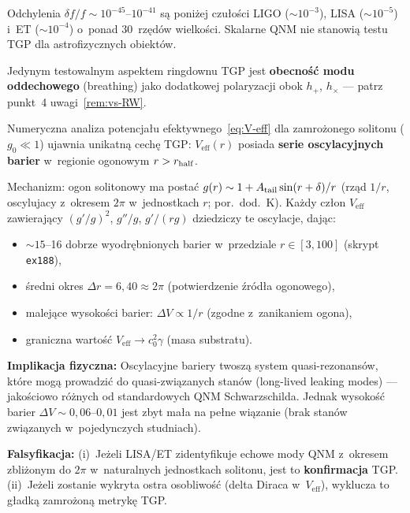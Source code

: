 \begin{remark}[Detektowalno\'s\'c]
Odchylenia $\delta f/f \sim 10^{-45}$--$10^{-41}$ s\k{a}
poni\.zej czu\l{}o\'sci LIGO ($\sim10^{-3}$),
LISA ($\sim10^{-5}$) i~ET ($\sim10^{-4}$) o~ponad
$30$~rz\k{e}d\'ow wielko\'sci. Ska\-lar\-ne QNM nie stanowi\k{a}
testu TGP dla astrofizycznych obiekt\'ow.

Jedynym testowalnym aspektem ringdownu TGP jest
\textbf{obecno\'s\'c modu oddechowego} (breathing)
jako dodatkowej polaryzacji obok $h_+$, $h_\times$ ---
patrz punkt~4 uwagi~\ref{rem:vs-RW}.
\end{remark}

\begin{remark}\label{rem:oscillatory-Veff}
Numeryczna analiza potencja\l{}u efektywnego~\eqref{eq:V-eff}
dla zamro\.zonego solitonu ($g_0 \ll 1$)
ujawnia unikatn\k{a} cech\k{e} TGP:
$V_{\mathrm{eff}}(r)$ posiada \textbf{serie oscylacyjnych barier}
w~regionie ogonowym $r > r_{\rm half}$.

Mechanizm: ogon solitonowy ma posta\'c
$g(r) \sim 1 + A_{\rm tail}\sin(r + \delta)/r$
(rz\k{a}d $1/r$, oscylujacy z~okresem $2\pi$ w~jednostkach
$r$; por.~dod.~K).
Ka\.zdy cz\l{}on $V_{\mathrm{eff}}$ zawieraj\k{a}cy
$(g'/g)^2$, $g''/g$, $g'/(rg)$ dziedziczy te oscylacje,
daj\k{a}c:
\begin{itemize}[nosep]
  \item $\sim 15$--16 dobrze wyodr\k{e}bnionych barier
    w~przedziale $r \in [3, 100]$ (skrypt \texttt{ex188}),
  \item \'sredni okres $\Delta r = 6{,}40 \approx 2\pi$
    (potwierdzenie \'zr\'od\l{}a ogonowego),
  \item malej\k{a}ce wysoko\'sci barier: $\Delta V \propto 1/r$
    (zgodne z~zanikaniem ogona),
  \item graniczna warto\'s\'c $V_{\mathrm{eff}} \to c_0^2\gamma$
    (masa substratu).
\end{itemize}

\textbf{Implikacja fizyczna:}
Oscylacyjne bariery twosz\k{a} system quasi-rezonans\'ow,
kt\'ore mog\k{a} prowadzi\'c do quasi-zwi\k{a}zanych stan\'ow
(long-lived leaking modes) --- jako\'sciowo r\'o\.znych
od standardowych QNM Schwarzschilda. Jednak wysoko\'s\'c
barier $\Delta V \sim 0{,}06$--$0{,}01$
jest zbyt ma\l{}a na pe\l{}ne wi\k{a}zanie (brak
stan\'ow zwi\k{a}zanych w~pojedynczych studniach).

\textbf{Falsyfikacja:}
(i)~Je\.zeli LISA/ET zidentyfikuje echowe mody QNM z~okresem
zbli\.zonym do $2\pi$ w~naturalnych jednostkach solitonu,
jest to \textbf{konfirmacja} TGP.
(ii)~Je\.zeli zostanie wykryta ostra osobliwo\'s\'c
(delta Diraca w~$V_{\mathrm{eff}}$), wyklucza to g\l{}adk\k{a}
zamro\.zon\k{a} metryk\k{e} TGP.
\end{remark}

